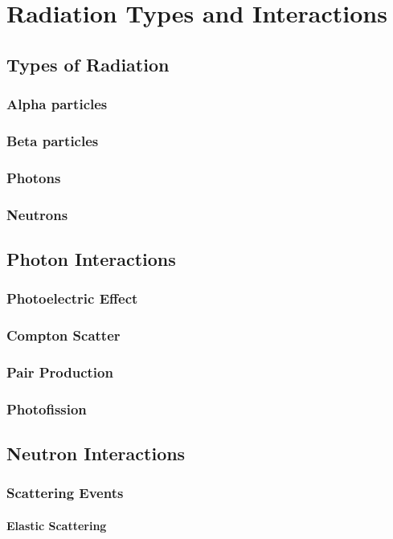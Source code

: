 \chapter{Radiation Types and Interactions}

\section{Types of Radiation}
\subsection{Alpha particles}
\subsection{Beta particles}
\subsection{Photons}
\subsection{Neutrons}

\section{Photon Interactions}
\subsection{Photoelectric Effect}
\subsection{Compton Scatter}
\subsection{Pair Production}
\subsection{Photofission}

\section{Neutron Interactions}
\subsection{Scattering Events}
\subsubsection{Elastic Scattering}
